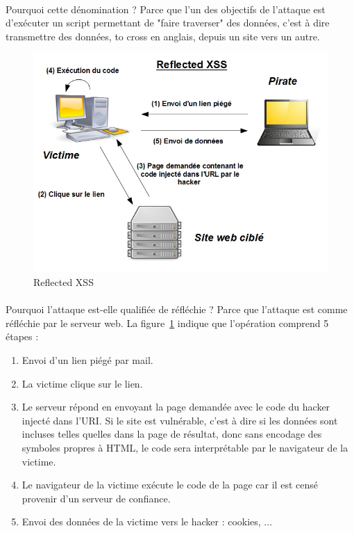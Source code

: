\paragraph{} Pourquoi cette dénomination ? Parce que l'un des objectifs de l'attaque est d’exécuter un script permettant de "faire traverser" des données, c'est à dire transmettre des données, to cross en anglais, depuis un site vers un autre. 

\begin{figure}[H] %
	\begin{center} 
		\includegraphics[scale=\scalekad]{images/xss/reflected_xss}
		\caption{Reflected XSS}
		\label{reflected_xss}  %
	\end{center}
\end{figure}


\paragraph{} Pourquoi l'attaque est-elle qualifiée de réfléchie ? Parce que l'attaque est comme réfléchie par le serveur web. La figure~\ref{reflected_xss} indique que l'opération comprend 5 étapes :


\begin{enumerate}
	\item   Envoi d'un lien piégé par mail. 
	\item La victime clique sur le lien.
	\item Le serveur répond en envoyant la page demandée avec le code du hacker injecté dans l'URI. Si le site est vulnérable, c'est à dire si les données sont incluses telles quelles dans la page de résultat, donc sans encodage des symboles propres à HTML, le code sera interprétable par le navigateur de la victime.
	\item Le navigateur de la victime exécute le code de la page car il est censé provenir d'un serveur de confiance. 
	\item Envoi des données de la victime  vers le hacker : cookies, ...
\end{enumerate}
 


